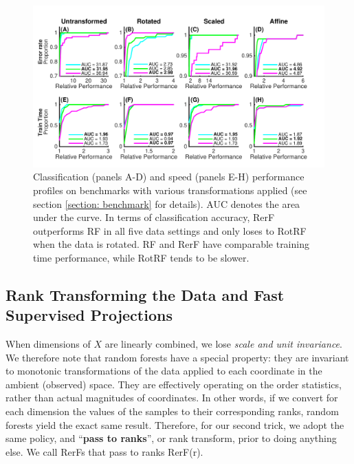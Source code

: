 \documentclass{article}
\begin{document}
\begin{figure}[ht]
\vskip 0.2in
\begin{center}
\centerline{\includegraphics[width=\columnwidth]{../Figures/pdf/Fig4_benchmark}}
\caption{Classification (panels A-D) and speed (panels E-H) performance profiles on benchmarks with various transformations applied (see section \ref{section: benchmark} for details). AUC denotes the area under the curve. In terms of classification accuracy, RerF outperforms RF in all five data settings and only loses to RotRF when the data is rotated. RF and RerF have comparable training time performance, while RotRF tends to be slower.}
\label{benchmark}
\end{center}
\vskip -0.2in
\end{figure}

\subsection{Rank Transforming the Data and Fast Supervised Projections}
\label{section: additions}

When dimensions of $X$ are linearly combined, we lose {\em{scale and unit invariance}}. We therefore note that random forests have a special property: they are invariant to monotonic transformations of the data applied to each coordinate in the ambient (observed) space. They are effectively operating on the order statistics, rather than actual magnitudes of coordinates. In other words, if we convert for each dimension the values of the samples to their corresponding ranks, random forests yield the exact same result. Therefore, for our second trick, we adopt the same policy, and ``{\bf{pass to ranks}}'', or rank transform,  prior to doing anything else. We call RerFs that pass to ranks RerF(r).
\end{document}
